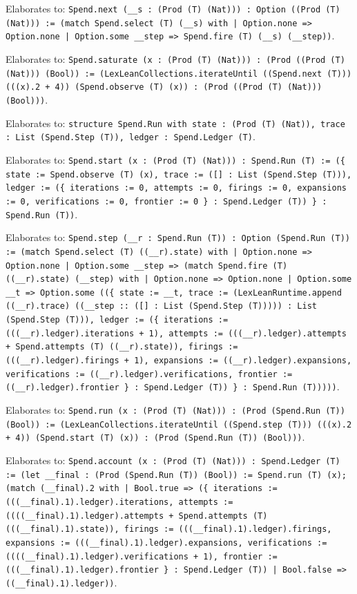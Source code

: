 \documentclass[11pt]{article}
\begin{document}
\noindent Elaborates to: \texttt{Spend.next (\_\_s : (Prod (T) (Nat))) : Option ((Prod (T) (Nat))) := (match Spend.select (T) (\_\_s) with | Option.none => Option.none | Option.some \_\_step => Spend.fire (T) (\_\_s) (\_\_step))}.\par
\noindent Elaborates to: \texttt{Spend.saturate (x : (Prod (T) (Nat))) : (Prod ((Prod (T) (Nat))) (Bool)) := (LexLeanCollections.iterateUntil ((Spend.next (T))) (((x).2 + 4)) (Spend.observe (T) (x)) : (Prod ((Prod (T) (Nat))) (Bool)))}.\par
\noindent Elaborates to: \texttt{structure Spend.Run with state : (Prod (T) (Nat)), trace : List (Spend.Step (T)), ledger : Spend.Ledger (T)}.\par
\noindent Elaborates to: \texttt{Spend.start (x : (Prod (T) (Nat))) : Spend.Run (T) := (\{ state := Spend.observe (T) (x), trace := ([] : List (Spend.Step (T))), ledger := (\{ iterations := 0, attempts := 0, firings := 0, expansions := 0, verifications := 0, frontier := 0 \} : Spend.Ledger (T)) \} : Spend.Run (T))}.\par
\noindent Elaborates to: \texttt{Spend.step (\_\_r : Spend.Run (T)) : Option (Spend.Run (T)) := (match Spend.select (T) ((\_\_r).state) with | Option.none => Option.none | Option.some \_\_step => (match Spend.fire (T) ((\_\_r).state) (\_\_step) with | Option.none => Option.none | Option.some \_\_t => Option.some ((\{ state := \_\_t, trace := (LexLeanRuntime.append ((\_\_r).trace) ((\_\_step :: ([] : List (Spend.Step (T))))) : List (Spend.Step (T))), ledger := (\{ iterations := (((\_\_r).ledger).iterations + 1), attempts := (((\_\_r).ledger).attempts + Spend.attempts (T) ((\_\_r).state)), firings := (((\_\_r).ledger).firings + 1), expansions := ((\_\_r).ledger).expansions, verifications := ((\_\_r).ledger).verifications, frontier := ((\_\_r).ledger).frontier \} : Spend.Ledger (T)) \} : Spend.Run (T)))))}.\par
\noindent Elaborates to: \texttt{Spend.run (x : (Prod (T) (Nat))) : (Prod (Spend.Run (T)) (Bool)) := (LexLeanCollections.iterateUntil ((Spend.step (T))) (((x).2 + 4)) (Spend.start (T) (x)) : (Prod (Spend.Run (T)) (Bool)))}.\par
\noindent Elaborates to: \texttt{Spend.account (x : (Prod (T) (Nat))) : Spend.Ledger (T) := (let \_\_final : (Prod (Spend.Run (T)) (Bool)) := Spend.run (T) (x); (match (\_\_final).2 with | Bool.true => (\{ iterations := (((\_\_final).1).ledger).iterations, attempts := ((((\_\_final).1).ledger).attempts + Spend.attempts (T) (((\_\_final).1).state)), firings := (((\_\_final).1).ledger).firings, expansions := (((\_\_final).1).ledger).expansions, verifications := ((((\_\_final).1).ledger).verifications + 1), frontier := (((\_\_final).1).ledger).frontier \} : Spend.Ledger (T)) | Bool.false => ((\_\_final).1).ledger))}.\par
\end{document}
